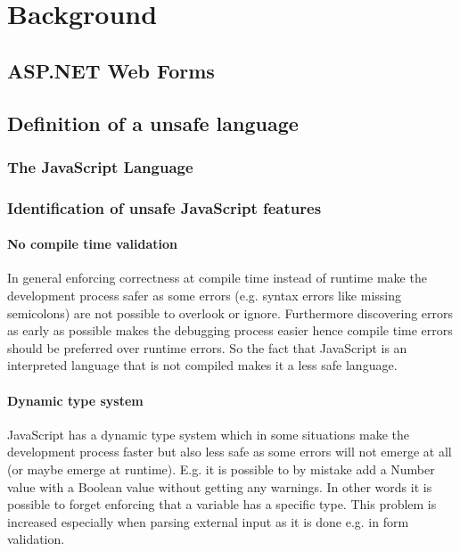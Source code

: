 \chapter{Background}

\section{ASP.NET Web Forms}

\section{Definition of a unsafe language}

	\subsection{The JavaScript Language}

	\subsection{Identification of unsafe JavaScript features}

		\subsubsection{No compile time validation}
			In general enforcing correctness at compile time instead of runtime make the development process safer as some errors (e.g. syntax errors like missing semicolons) are not possible to overlook or ignore. Furthermore discovering errors as early as possible makes the debugging process easier hence compile time errors should be preferred over runtime errors. So the fact that JavaScript is an interpreted language that is not compiled makes it a less safe language.

		\subsubsection{Dynamic type system}
			JavaScript has a dynamic type system which in some situations make the development process faster but also less safe as some errors will not emerge at all (or maybe emerge at runtime). E.g. it is possible to by mistake add a Number value with a Boolean value without getting any warnings. In other words it is possible to forget enforcing that a variable has a specific type. This problem is increased especially when parsing external input as it is done e.g. in form validation.
		
